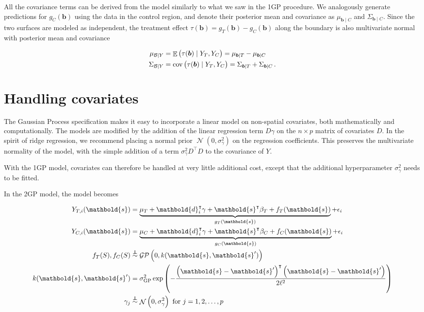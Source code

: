 \documentclass[letter]{article}
\DeclareMathOperator{\E}{\mathbb{E}}
\DeclareMathOperator{\cov}{{cov}}
\DeclareMathOperator{\normal}{\mathcal{N}}
\newcommand{\gp}{\mathcal{GP}}
\newcommand{\trans}{^{\intercal}}
\newcommand{\sigmaf}{\sigma_{\mathrm{GP}}}
\newcommand{\sigmagamma}{\sigma_{\gamma}}
\newcommand{\svec}{\mathbold{s}}
\newcommand{\dvec}{\mathbold{d}}
\newcommand{\indep}{\protect\mathpalette{\protect\independenT}{\perp}}
\def\independenT#1#2{\mathrel{\rlap{$#1#2$}\mkern2mu{#1#2}}}
\newcommand{\boundary}{\mathcal{B}}
\newcommand{\sentinels}{\bm{b}}
\newcommand{\eqlabel}[1]{\label{#1}}
\begin{document}
All the covariance terms can be derived from the model similarly to what we saw in the 1GP procedure.
We analogously generate predictions for \(g_C(\sentinels)\) using the data in the control region, and denote their posterior mean and covariance as \(\mu_{\sentinels \mid C}\) and \(\Sigma_{\sentinels \mid C}\). Since the two surfaces are modeled as independent, the treatment effect \(\tau(\sentinels)=g_T(\sentinels)-g_C(\sentinels)\) along the boundary is also multivariate normal with posterior mean and covariance

\begin{equation}
\begin{split}
    \mu_{\boundary \mid Y} &= \E \del{\tau(\sentinels) \mid Y_T, Y_C} = \mu_{\sentinels \mid T} - \mu_{\sentinels \mid C} \\
    \Sigma_{\boundary \mid Y} &= \cov\del{\tau(\sentinels) \mid Y_T, Y_C} = \Sigma_{\sentinels \mid T} + \Sigma_{\sentinels \mid C}\,.
\end{split}
\eqlabel{eq:postvar2gp}
\end{equation}
    


    	\section{Handling covariates}\label{handling-covariates}

The Gaussian Process specification makes it easy to incorporate a linear model on non-spatial covariates, both mathematically and computationally.
The models are modified by the addition of the linear regression term \(D \gamma\) on the \(n \times p\) matrix of covariates \(D\). In the spirit of ridge regression, we recommend placing a normal prior \(\normal(0,\sigmagamma^2)\) on the regression coefficients. This preserves the multivariate normality of the model, with the simple addition of a term \(\sigmagamma^2 D\trans D\) to the covariance of \(Y\).

With the 1GP model, covariates can therefore be handled at very little additional cost, except that the additional hyperparameter \(\sigmagamma^2\) needs to be fitted.

In the 2GP model, the model becomes

\begin{equation}
\begin{split}
Y_{T,i}(\svec) &= \underbrace{\mu_T + \dvec_i\trans \gamma + \svec\trans\beta_T + f_T(\svec)}_{g_T(\svec)} + \epsilon_i \\
Y_{C,i}(\svec) &= \underbrace{\mu_C + \dvec_i\trans \gamma + \svec\trans\beta_C + f_C(\svec)}_{g_C(\svec)} + \epsilon_i \\
f_T(S), f_C(S) &\overset{\indep}{\sim} \gp\del{0, k(\svec, \svec')} \\
k(\svec,\svec') &= \sigmaf^2 \exp\del{ - \frac{\del{\svec-\svec'}\trans\del{\svec-\svec'}}{2 \ell^2}} \\
\gamma_j &\overset{\indep}{\sim} \normal\del{0,\sigmagamma^2}\text{ for }j=1,2,\ldots,p
\end{split}
\end{equation}
\end{document}
